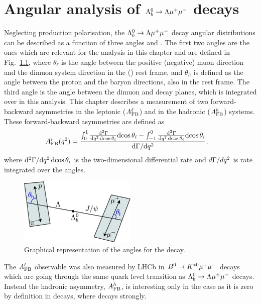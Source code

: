 \chapter{Angular analysis of $\protect\Lambda^0_b\rightarrow\Lambda\mu^+\mu^-$ decays}
\label{sec:ang_ana}

Neglecting \Lb production polarisation, the $\Lambda^0_b\rightarrow\Lambda\mu^+\mu^-$ decay angular distributions can be described 
as a function of three angles and \qsq. The first two angles are the ones which are relevant for the
analysis in this chapter and are defined in Fig.~\ref{fig:Lb_angles}, where $\theta_\ell$ is the angle between 
the positive (negative) muon direction and the dimuon system direction in the \Lb (\Lbbar) rest frame,
and $\theta_h$ is defined as the angle between the proton and the \Lz baryon directions, also in the
\Lb rest frame. The third angle is the angle between the dimuon and \Lz decay planes, which is integrated
over in this analysis. %
This chapter describes a measurement of two forward-backward asymmetries in the leptonic
($A_{\rm FB}^\ell$) and in the hadronic ($A_{\rm FB}^h$) systems. These forward-backward asymmetries
are defined as
\begin{align}
A_{\rm FB}^i(q^2)&=\frac{\int_0^1 \frac{\mathrm{d}^2\Gamma}{\mathrm{d}q^2\,\mathrm{d}\!\cos\theta_i} \mathrm{d}\!\cos\theta_i-
               \int^0_{-1} \frac{\mathrm{d}^2\Gamma}{\mathrm{d}q^2\,\mathrm{d}\!\cos\theta_i} \mathrm{d}\!\cos\theta_i}{\mathrm{d}\Gamma / \mathrm{d} q^2},
\label{eq:afbTh}
\end{align}
where $\mathrm{d}^2\Gamma/\mathrm{d} q^2\,\mathrm{d}\!\cos\theta_i$ is the two-dimensional differential rate and
$d\Gamma / dq^2$ is rate integrated over the angles. 

\begin{figure}[h!]
\centering
\includegraphics[width=0.5\textwidth]{Lmumu/figs/angles.jpeg}
\caption{Graphical representation of the angles for the \decay{\Lb}{\Lz\mumu} decay.}
\label{fig:Lb_angles}
\end{figure}

The $A_{\rm FB}^\ell$ observable was also measured by LHCb in $B^0\rightarrow K^{*0}\mu^+\mu^-$ decays
which are going through the same quark level transition as $\Lambda^0_b\rightarrow\Lambda\mu^+\mu^-$ decays. Instead the hadronic
asymmetry, $A_{\rm FB}^h$, is interesting only in the \Lb case as it is zero by definition
in \Bz decays, where \Kstarz decays strongly.

